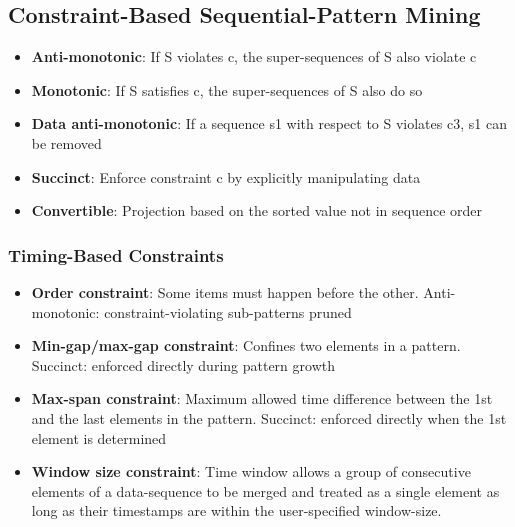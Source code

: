 \subsection{Constraint-Based Sequential-Pattern Mining}

\begin{itemize}
\item \textbf{Anti-monotonic}: If S violates c, the super-sequences of S also violate c
\item \textbf{Monotonic}: If S satisfies c, the super-sequences of S also do so
\item \textbf{Data anti-monotonic}: If a sequence s1 with respect to S violates c3, s1 can be removed
\item \textbf{Succinct}: Enforce constraint c by explicitly manipulating data
\item \textbf{Convertible}: Projection based on the sorted value not in sequence order
\end{itemize}

\subsubsection{Timing-Based Constraints}
\begin{itemize}
\item \textbf{Order constraint}: Some items must happen before the other. Anti-monotonic: constraint-violating sub-patterns pruned
\item \textbf{Min-gap/max-gap constraint}: Confines two elements in a pattern. Succinct: enforced directly during pattern growth
\item \textbf{Max-span constraint}: Maximum allowed time difference between the 1st and the last elements in the pattern. Succinct: enforced directly when the 1st element is determined
\item \textbf{Window size constraint}: Time window allows a group of consecutive elements of a data-sequence to be merged and treated as a single element as long as their timestamps are within the user-specified window-size.
\end{itemize}

